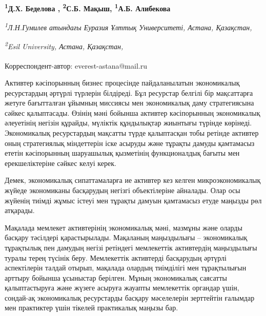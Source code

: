
\begin{articleheader}

{\bfseries
\textsuperscript{1}Д.Х. Беделова\textsuperscript{\envelope } \authorid,
\textsuperscript{2}С.Б. Мақыш\authorid,
\textsuperscript{1}А.Б. Алибекова\authorid}
\end{articleheader}

\begin{affiliation}
{\em \textsuperscript{1}Л.Н.Гумилев атындағы Еуразия Ұлттық Университеті, Астана, Қазақстан,}

{\em \textsuperscript{2}Esil University, Астана, Қазақстан,}

\textsuperscript{\envelope }Корреспондент-автор: everest-astana@mail.ru
\end{affiliation}

Активтер кәсіпорынның бизнес процесінде пайдаланылатын экономикалық
ресурстардың әртүрлі түрлерін білдіреді. Бұл ресурстар белгілі бір
мақсаттарға жетуге бағытталған ұйымның миссиясы мен экономикалық даму
стратегиясына сәйкес қалыптасады. Өзінің мәні бойынша активтер
кәсіпорынның экономикалық әлеуетінің негізін құрайды, мүліктік
құндылықтар жиынтығы түрінде көрінеді. Экономикалық ресурстардың
мақсатты түрде қалыптасқан тобы ретінде активтер оның стратегиялық
міндеттерін іске асыруды және тұрақты дамуды қамтамасыз ететін
кәсіпорынның шаруашылық қызметінің функционалдық бағыты мен
ерекшеліктеріне сәйкес келуі керек.

Демек, экономикалық сипаттамаларға ие активтер кез келген
микроэкономикалық жүйеде экономиканы басқарудың негізгі объектілеріне
айналады. Олар осы жүйенің тиімді жұмыс істеуі мен тұрақты дамуын
қамтамасыз етуде маңызды рөл атқарады.

Мақалада мемлекет активтерінің экономикалық мәні, мазмұны және оларды
басқару тәсілдері қарастырылады. Мақаланың маңыздылығы -- экономикалық
тұрақтылық пен дамудың негізі ретіндегі мемлекеттік активтердің
маңыздылығы туралы терең түсінік беру. Мемлекеттік активтерді басқарудың
әртүрлі аспектілерін талдай отырып, мақалада олардың тиімділігі мен
тұрақтылығын арттыру бойынша ұсыныстар берілген. Мұның экономикалық
саясатты қалыптастыруға және жүзеге асыруға жауапты мемлекеттік органдар
үшін, сондай-ақ экономикалық ресурстарды басқару мәселелерін зерттейтін
ғалымдар мен практиктер үшін тікелей практикалық маңызы бар.


